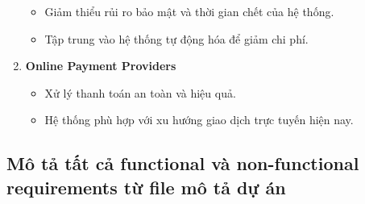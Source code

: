 \documentclass[a4paper]{article}
\begin{document}
\begin{enumerate}
\begin{itemize}
                \item Giảm thiểu rủi ro bảo mật và thời gian chết của hệ thống.
                \item Tập trung vào hệ thống tự động hóa để giảm chi phí.
            \end{itemize}
        \item {\textbf{Online Payment Providers}}
            \begin{itemize}
                \item Xử lý thanh toán an toàn và hiệu quả.
                \item Hệ thống phù hợp với xu hướng giao dịch trực tuyến hiện nay.
            \end{itemize}
    \end{enumerate}
\subsection{Mô tả tất cả  functional và non-functional requirements từ file mô tả dự án  }
 \captionsetup[table]{name=Table}
\end{document}
